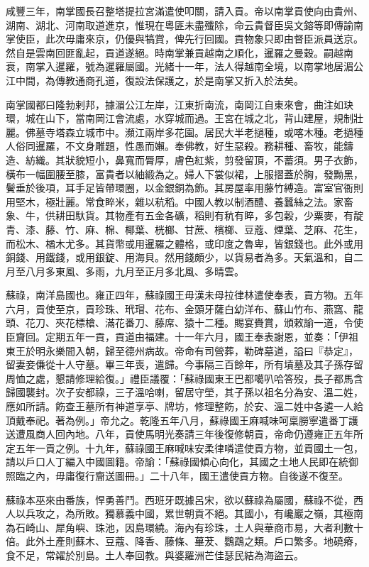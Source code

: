 \begin{pinyinscope}
咸豐三年，南掌國長召整塔提拉宮滿遣使叩關，請入貢。帝以南掌貢使向由貴州、湖南、湖北、河南取道進京，惟現在粵匪未盡殲除，命云貴督臣吳文鎔等即傳諭南掌使臣，此次毋庸來京，仍優與犒賞，俾先行回國。貢物象只即由督臣派員送京。然自是雲南回匪亂起，貢道遂絕。時南掌兼貢越南之順化，暹羅之曼穀。嗣越南衰，南掌入暹羅，號為暹羅屬國。光緒十一年，法人得越南全境，以南掌地居湄公江中間，為傳教通商孔道，復設法保護之，於是南掌又折入於法矣。

南掌國都曰隆勃剌邦，據湄公江左岸，江東折南流，南岡江自東來會，曲注如玦環，城在山下，當南岡江會流處，水穿城而過。王宮在城之北，背山建屋，規制壯麗。佛墓寺塔森立城市中。瀕江兩岸多花園。居民大半老撾種，或喀木種。老撾種人俗同暹羅，不文身雕題，性愚而嬾。奉佛教，好生惡殺。務耕種、畜牧，能鑄造、紡織。其狀貌短小，鼻寬而脣厚，膚色紅紫，剪發留頂，不蓄須。男子衣飾，橫布一幅圍腰至膝，富貴者以紬緞為之。婦人下裳似裙，上服摺蓋於胸，發黝黑，鬢垂於後項，耳手足皆帶環圈，以金銀銅為飾。其房屋率用藤竹縛造。富室官衙則用堅木，極壯麗。常食睟米，雜以秔稻。中國人教以制酒醴、養蠶絲之法。家畜象、牛，供耕田馱貨。其物產有五金各礦，稻則有秔有睟，多包穀，少粟麥，有靛青、漆、藤、竹、麻、棉、椰葉、桄榔、甘蔗、檳榔、豆蔻、煙葉、芝麻、花生，而松木、楢木尤多。其貨幣或用暹羅之體格，或印度之魯卑，皆銀錢也。此外或用銅錢、用鐵錢，或用銀錠、用海貝。然用錢頗少，以貨易者為多。天氣溫和，自二月至八月多東風、多雨，九月至正月多北風、多晴雲。

蘇祿，南洋島國也。雍正四年，蘇祿國王毋漢未母拉律林遣使奉表，貢方物。五年六月，貢使至京，貢珍珠、玳瑁、花布、金頭牙薩白幼洋布、蘇山竹布、燕窩、龍頭、花刀、夾花標槍、滿花番刀、藤席、猿十二種。賜宴賚賞，頒敕諭一道，令使臣齎回。定期五年一貢，貢道由福建。十一年六月，國王奉表謝恩，並奏：「伊祖東王於明永樂間入朝，歸至德州病故。帝命有司營葬，勒碑墓道，謚曰『恭定』，留妻妾傔從十人守墓。畢三年喪，遣歸。今事隔三百餘年，所有墳墓及其子孫存留周恤之處，懇請修理給復。」禮臣議覆：「蘇祿國東王巴都噶叭哈答歿，長子都馬含歸國襲封。次子安都祿，三子溫哈喇，留居守塋，其子孫以祖名分為安、溫二姓，應如所請。飭查王墓所有神道享亭、牌坊，修理整飭，於安、溫二姓中各遴一人給頂戴奉祀。著為例。」帝允之。乾隆五年八月，蘇祿國王麻喊味呵稟朥寧遣番丁護送遭風商人回內地。八年，貢使馬明光奏請三年後復修朝貢，帝命仍遵雍正五年所定五年一貢之例。十九年，蘇祿國王麻喊味安柔律噒遣使貢方物，並貢國土一包，請以戶口人丁編入中國圖籍。帝諭：「蘇祿國傾心向化，其國之土地人民即在統御照臨之內，毋庸復行齎送圖冊。」二十八年，國王遣使貢方物。自後遂不復至。

蘇祿本巫來由番族，悍勇善鬥。西班牙既據呂宋，欲以蘇祿為屬國，蘇祿不從，西人以兵攻之，為所敗。獨慕義中國，累世朝貢不絕。其國小，有巉巖之嶺，其極南為石崎山、犀角嶼、珠池，因島環繞。海內有珍珠，土人與華商市易，大者利數十倍。此外土產則蘇木、豆蔻、降香、藤條、蓽茇、鸚鵡之類。戶口繁多。地磽瘠，食不足，常糴於別島。土人奉回教。與婆羅洲芒佳瑟民結為海盜云。


\end{pinyinscope}